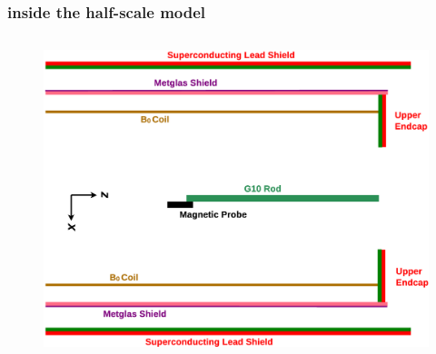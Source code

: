 \documentclass{beamer}
\begin{document}
\begin{frame}
\begin{columns}
    \end{columns}

\end{frame}

\begin{frame}
\frametitle{inside the half-scale model}

    \begin{columns}
    
    \begin{column}{0.5\textwidth}
    \begin{figure}
    \includegraphics[width=\textwidth, angle=90, trim=70px 70px 70px 70px]
    {figures/simplified_structure.eps}
    \end{figure}
    \end{column}

    \pause


\end{columns}
\end{frame}
\end{document}
